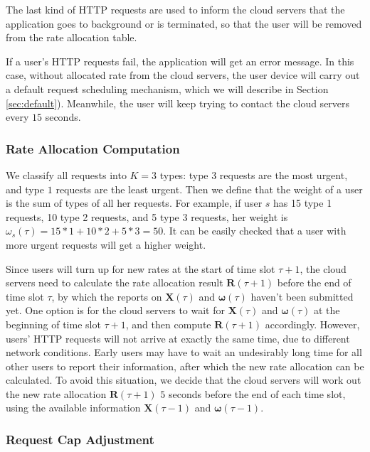 The last kind of HTTP requests are used to inform the cloud servers that the application goes to background or is terminated, so that the user will be removed from the rate allocation table. 

If a user's HTTP requests fail, the application will get an error message. In this case, without allocated rate from the cloud servers, the user device will carry out a default request scheduling mechanism, which we will describe in Section \ref{sec:default}). Meanwhile, the user will keep trying to contact the cloud servers every $15$ seconds.   

\subsubsection{Rate Allocation Computation}\label{sec:rate}

We classify all requests into $K = 3$ types: type $3$ requests are the most urgent, and type $1$ requests are the least urgent. Then we define that the weight of a user is the sum of types of all her requests. For example, if user $s$ has 15 type 1 requests, 10 type 2 requests, and 5 type 3 requests, her weight is $\omega_s(\tau) = 15*1+10*2+5*3 = 50$.  It can be easily checked that a user with more urgent requests will get a higher weight.

Since users will turn up for new rates at the start of time slot $\tau+1$, the cloud servers need to calculate the rate allocation result $\pmb{R}(\tau+1)$ before the end of time slot $\tau$, by which the reports on $\pmb{X}(\tau)$ and $\pmb{\omega}(\tau)$ haven't been submitted yet. One option is for the cloud servers to wait for $\pmb{X}(\tau)$ and $\pmb{\omega}(\tau)$ at the beginning of time slot $\tau+1$, and then compute $\pmb{R}(\tau+1)$ accordingly. However, users' HTTP requests will not arrive at exactly the same time, due to different network conditions. Early users may have to wait an undesirably long time for all other users to report their information, after which the new rate allocation can be calculated. To avoid this situation, we decide that the cloud servers will work out the new rate allocation $\pmb{R}(\tau+1)$ $5$ seconds before the end of each time slot, using the available information $\pmb{X}(\tau-1)$ and $\pmb{\omega}(\tau-1)$. 


\subsubsection{Request Cap Adjustment}      

